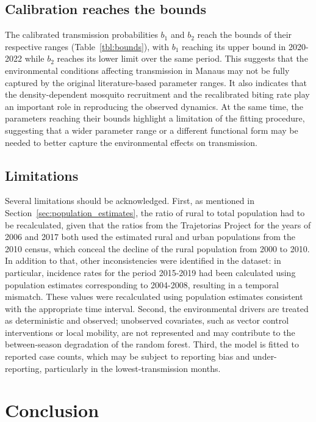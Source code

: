 \documentclass[a4paper,fleqn]{cas-dc}
\begin{document}
\subsection{Calibration reaches the bounds}
\label{sec:calibration_reaches_bounds}

The calibrated transmission probabilities $b_1$ and $b_2$ reach the bounds of their respective ranges
(Table~\ref{tbl:bounds}), with $b_1$ reaching its upper bound in 2020-2022 while $b_2$ reaches 
its lower limit over the same period. This suggests that the environmental conditions affecting transmission in 
Manaus may not be fully captured by the original literature-based parameter ranges. It also indicates 
that the density-dependent mosquito recruitment and the recalibrated biting rate play an important 
role in reproducing the observed dynamics. At the same time, the parameters reaching their bounds 
highlight a limitation of the fitting procedure, suggesting that a wider parameter range or a different 
functional form may be needed to better capture the environmental effects on transmission.

\subsection{Limitations}
\label{sec:limitations}
Several limitations should be acknowledged. First, as mentioned in
Section~\ref{sec:population_estimates}, the ratio of rural to total population had to be recalculated,
given that the ratios from the Trajetorias Project \cite{Rorato2023} for the years of 2006 and 2017 both used 
the estimated rural and urban populations from the 2010 census, which conceal the decline of the rural population from 2000 to 2010. 
In addition to that, other inconsistencies were identified in the dataset: in particular, 
incidence rates for the period 2015-2019 had been calculated using population estimates corresponding 
to 2004-2008, resulting in a temporal mismatch. These values were recalculated using population 
estimates consistent with the appropriate time interval.
Second, the environmental drivers are treated as
deterministic and observed; unobserved covariates, such as vector
control interventions or local mobility, are not represented and may
contribute to the between-season degradation of the random forest.
Third, the model is fitted to reported case counts, which may be
subject to reporting bias and under-reporting, particularly in the
lowest-transmission months. 

\section{Conclusion}
\label{sec:conclusion}
\end{document}
